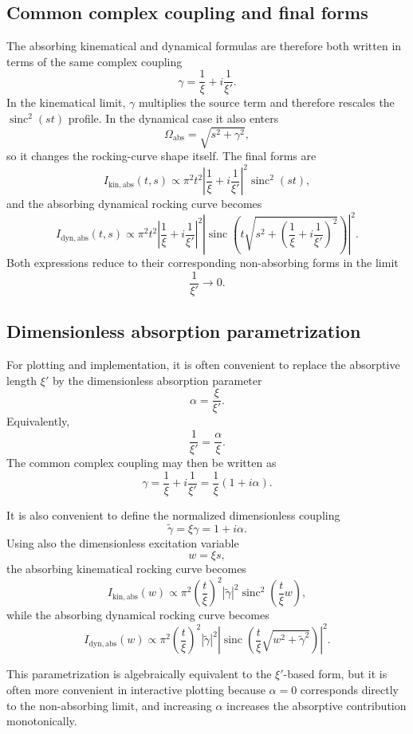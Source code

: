 \documentclass[11pt]{article}
\begin{document}
\subsection{Common complex coupling and final forms}

The absorbing kinematical and dynamical formulas are therefore both written in terms of the same complex coupling
\[
\gamma=\frac{1}{\xi}+i\frac{1}{\xi'}.
\]
In the kinematical limit, \(\gamma\) multiplies the source term and therefore rescales the \(\operatorname{sinc}^2(st)\) profile. In the dynamical case it also enters
\[
\Omega_{\mathrm{abs}}=\sqrt{s^2+\gamma^2},
\]
so it changes the rocking-curve shape itself. The final forms are
\[
I_{\mathrm{kin,abs}}(t,s)
\propto
\pi^2 t^2 \left|\frac{1}{\xi}+i\frac{1}{\xi'}\right|^2
\operatorname{sinc}^2(st),
\]
and the absorbing dynamical rocking curve becomes
\[
I_{\mathrm{dyn,abs}}(t,s)
\propto
\pi^2 t^2
\left|\frac{1}{\xi}+i\frac{1}{\xi'}\right|^2
\left|
\operatorname{sinc}\!\left(
t\sqrt{s^2+\left(\frac{1}{\xi}+i\frac{1}{\xi'}\right)^2}
\right)
\right|^2.
\]
Both expressions reduce to their corresponding non-absorbing forms in the limit
\[
\frac{1}{\xi'}\to 0.
\]
\subsection{Dimensionless absorption parametrization}

For plotting and implementation, it is often convenient to replace the absorptive length
\(\xi'\) by the dimensionless absorption parameter
\[
\alpha=\frac{\xi}{\xi'}.
\]
Equivalently,
\[
\frac{1}{\xi'}=\frac{\alpha}{\xi}.
\]
The common complex coupling may then be written as
\[
\gamma=\frac{1}{\xi}+i\frac{1}{\xi'}
=\frac{1}{\xi}(1+i\alpha).
\]

It is also convenient to define the normalized dimensionless coupling
\[
\tilde{\gamma}=\xi\gamma=1+i\alpha.
\]
Using also the dimensionless excitation variable
\[
w=\xi s,
\]
the absorbing kinematical rocking curve becomes
\[
I_{\mathrm{kin,abs}}(w)
\propto
\pi^2\left(\frac{t}{\xi}\right)^2
|\tilde{\gamma}|^2
\operatorname{sinc}^2\!\left(\frac{t}{\xi}w\right),
\]
while the absorbing dynamical rocking curve becomes
\[
I_{\mathrm{dyn,abs}}(w)
\propto
\pi^2\left(\frac{t}{\xi}\right)^2
|\tilde{\gamma}|^2
\left|
\operatorname{sinc}\!\left(
\frac{t}{\xi}\sqrt{w^2+\tilde{\gamma}^2}
\right)
\right|^2.
\]

This parametrization is algebraically equivalent to the \(\xi'\)-based form, but it is often
more convenient in interactive plotting because \(\alpha=0\) corresponds directly to the
non-absorbing limit, and increasing \(\alpha\) increases the absorptive contribution
monotonically.
\end{document}

